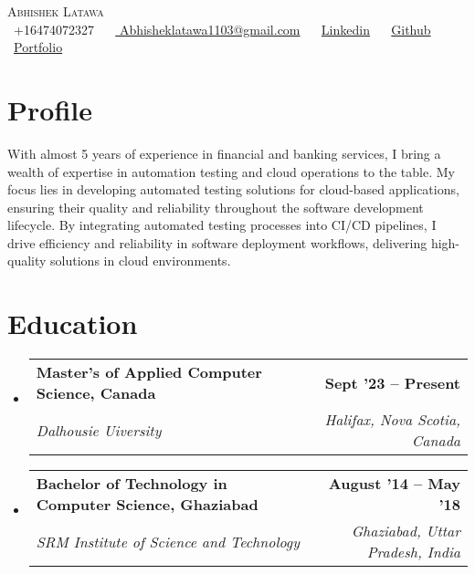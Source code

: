 \documentclass[letterpaper,11pt]{article}
\makeatletter
\newcommand{\resumeSubheading}[4]{
  \vspace{-2pt}\item
    \begin{tabular*}{1.0\textwidth}[t]{l@{\extracolsep{\fill}}r}
      \textbf{#1} & \textbf{\small #2} \\
      \textit{\small#3} & \textit{\small #4} \\
    \end{tabular*}\vspace{-7pt}
}
\newcommand{\resumeSubHeadingListStart}{\begin{itemize}[leftmargin=0.0in, label={}]}
\newcommand{\resumeSubHeadingListEnd}{\end{itemize}}
\makeatother
\begin{document}

\begin{center}
    {\Huge \scshape Abhishek Latawa} \\ \vspace{1pt}
    \vspace{5pt}
    \small \raisebox{-0.1\height}\faPhone\ +16474072327 ~
    \raisebox{-0.2\height}\faEnvelope\ \href{mailto:yashbest005@gmail.com}{ Abhisheklatawa1103@gmail.com} ~
    \raisebox{-0.2\height}\faLinkedin\ \href{https://www.linkedin.com/in/abhishek-latawa-a3177b129/}{Linkedin} ~
    \raisebox{-0.2\height}\faGithub\ \href{https://github.com/abhilatawa}{Github} ~ \raisebox{-0.2\height}\faGlobe\ \href{https://read.cv/alatawa}{Portfolio}
    \vspace{-8pt}
\end{center}

\section{Profile}
{With almost 5 years of experience in financial and banking services, I bring a wealth of expertise in automation testing and cloud operations to the table. My focus lies in developing automated testing solutions for cloud-based applications, ensuring their quality and reliability throughout the software development lifecycle. By integrating automated testing processes into CI/CD pipelines, I drive efficiency and reliability in software deployment workflows, delivering high-quality solutions in cloud environments.}


\section{Education}
  \resumeSubHeadingListStart
    \resumeSubheading
    {Master's of Applied Computer Science, Canada}{Sept '23 -- Present}
      {Dalhousie Uiversity }{Halifax, Nova Scotia, Canada}
      \resumeSubheading
      {Bachelor of Technology in Computer Science, Ghaziabad}{August '14 -- May '18}
      {SRM Institute of Science and Technology}{Ghaziabad, Uttar Pradesh, India}
  \resumeSubHeadingListEnd
\end{document}
